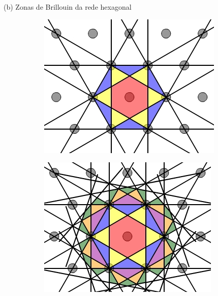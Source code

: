 \documentclass[aspectratio=169]{beamer}
\begin{document}


\begin{frame}{(b) Zonas de Brillouin da rede hexagonal}

\begin{figure}[H]
\centering
\begin{subfigure}{.45\textwidth}
  \centering
  \includegraphics[width=\linewidth]{fig/hexbz_construct-7.png}
\end{subfigure}%
\quad \quad
\begin{subfigure}{.45\textwidth}
  \centering
  \includegraphics[width=\linewidth]{fig/hexbz_construct-8.png}
\end{subfigure}
\end{figure}

\end{frame}
\end{document}
